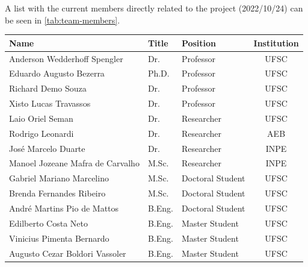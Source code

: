 A list with the current members directly related to the project (2022/10/24) can be seen in \autoref{tab:team-members}.

\begin{table}[!htb]
    \centering
    \begin{tabular}{lllc}
        \toprule[1.5pt]
        \textbf{Name} & \textbf{Title} & \textbf{Position} & \textbf{Institution} \\
        \midrule
        Anderson Wedderhoff Spengler        & Dr.       & Professor             & UFSC \\
        Eduardo Augusto Bezerra             & Ph.D.     & Professor             & UFSC \\
        Richard Demo Souza                  & Dr.       & Professor             & UFSC \\
        Xisto Lucas Travassos               & Dr.       & Professor             & UFSC \\
        Laio Oriel Seman                    & Dr.       & Researcher            & UFSC \\
        Rodrigo Leonardi                    & Dr.       & Researcher            & AEB \\
        José Marcelo Duarte                 & Dr.       & Researcher            & INPE \\
        Manoel Jozeane Mafra de Carvalho    & M.Sc.     & Researcher            & INPE \\
        Gabriel Mariano Marcelino           & M.Sc.     & Doctoral Student      & UFSC \\
        Brenda Fernandes Ribeiro            & M.Sc.     & Doctoral Student      & UFSC \\
        André Martins Pio de Mattos         & B.Eng.    & Doctoral Student      & UFSC \\
        Edilberto Costa Neto                & B.Eng.    & Master Student      & UFSC \\
        Vinicius Pimenta Bernardo           & B.Eng.    & Master Student      & UFSC \\
        Augusto Cezar Boldori Vassoler      & B.Eng.    & Master Student      & UFSC \\

\end{tabular}
\end{table}
